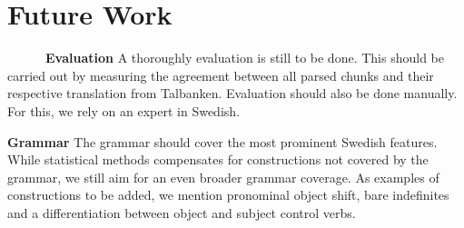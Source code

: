 \documentclass[runningheads,a4paper]{llncs}
\begin{document}
%



\section{Future Work}

~~~~~~\textbf{Evaluation}
A thoroughly evaluation is still to be done. This should be carried out by
measuring the agreement between all parsed chunks and their respective
translation from Talbanken. Evaluation should also be done manually.
For this, we rely on an expert in Swedish.

 
\textbf{Grammar}
The grammar should cover the most prominent Swedish features.
While statistical methods compensates for constructions not covered by
the grammar, we still aim for an even broader grammar coverage. 
As examples of constructions to be added, we mention
pronominal object shift, bare indefinites and a differentiation between
object and subject control verbs.
%
%
\end{document}
